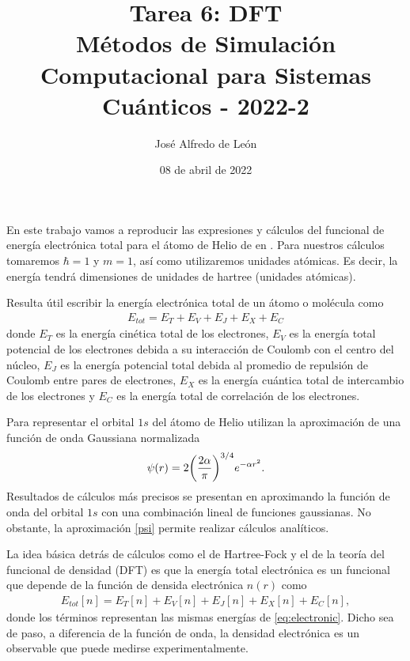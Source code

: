 \documentclass[11pt,letterpaper]{article}
\author{José Alfredo de León}
\title{Tarea 6: DFT\\
\large{Métodos de Simulación Computacional para Sistemas Cuánticos - 2022-2}}
\newcommand{\autores}{\text{Baseden y Tye}}
\begin{document}
\date{08 de abril de 2022}
\maketitle

En este trabajo vamos a reproducir las expresiones y cálculos del funcional
de energía electrónica total para el átomo de Helio de \autores{} en \cite{baseden2014introduction}. 
Para nuestros cálculos tomaremos $\hbar=1$ y $m=1$, así como utilizaremos
unidades atómicas. Es decir, la energía tendrá dimensiones de unidades
de hartree (unidades atómicas).

Resulta útil escribir la energía electrónica total de un átomo o molécula
como
\begin{align}\label{eq:electronic}
E_{tot}=E_T+E_V+E_J+E_X+E_C
\end{align}
donde $E_T$ es la energía cinética total de los electrones, $E_V$ es 
la energía total potencial de los electrones debida a su interacción de 
Coulomb con el centro del núcleo, $E_J$ es la energía potencial total debida al
promedio de repulsión de Coulomb entre pares de electrones, $E_X$ es la energía
cuántica total de intercambio de los electrones y $E_C$ es la energía total
de correlación de los electrones. 

Para representar el orbital $1s$ del átomo de Helio \autores{} utilizan
la aproximación de una función de onda Gaussiana normalizada
\begin{align}\label{psi}
\psi(r)=2\qty(\frac{2\alpha}{\pi})^{3/4}e^{-\alpha r^2}.
\end{align}
Resultados de cálculos más precisos se presentan en \cite{baseden2014introduction}
aproximando la función de onda del orbital $1s$ con una combinación 
lineal de funciones gaussianas. No obstante, la aproximación \eqref{psi}
permite realizar cálculos analíticos.

La idea básica detrás de cálculos como el de Hartree-Fock y el de la teoría 
del funcional de densidad (DFT) es que la energía total electrónica es un
funcional que depende de la función de densida electrónica $n(r)$ como
\begin{align}\label{eq:functional}
E_{tot}[n]=E_T[n]+E_V[n]+E_J[n]+E_X[n]+E_C[n],
\end{align}
donde los términos representan las mismas energías de \eqref{eq:electronic}.
Dicho sea de paso, a diferencia de la función de onda, la densidad 
electrónica es un observable que puede medirse experimentalmente. 
\end{document}
